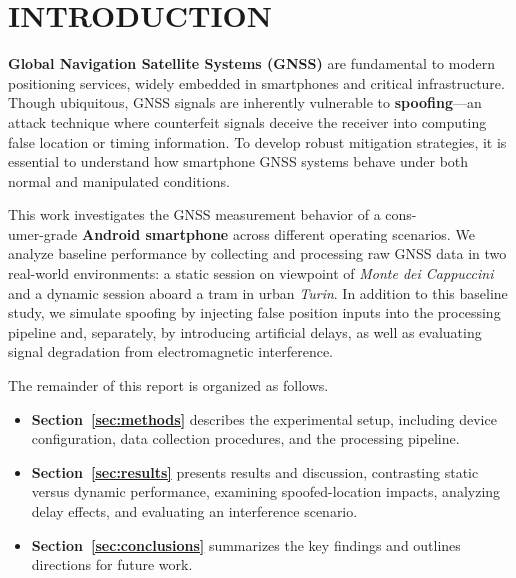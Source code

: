 
\section{INTRODUCTION} \label{sec:introduction}

    \textbf{Global Navigation Satellite Systems (GNSS)} are fundamental to modern positioning services, widely embedded in smartphones and critical infrastructure. 
    Though ubiquitous, GNSS signals are inherently vulnerable to \textbf{spoofing}—an attack technique where counterfeit signals deceive the receiver into computing false location or timing information. 
    To develop robust mitigation strategies, it is essential to understand how smartphone GNSS systems behave under both normal and manipulated conditions.

    \noindent This work investigates the GNSS measurement behavior of a cons-\\umer-grade \textbf{Android smartphone} across different operating scenarios. 
    We analyze baseline performance by collecting and processing raw GNSS data in two real-world environments: a static session on viewpoint of \textit{Monte dei Cappuccini} and a dynamic session aboard a tram in urban \textit{Turin}. 
    In addition to this baseline study, we simulate spoofing by injecting false position inputs into the processing pipeline and, separately, by introducing artificial delays, as well as evaluating signal degradation from electromagnetic interference.

    \noindent The remainder of this report is organized as follows.
    
    \begin{itemize}
        \item \textbf{Section~\ref{sec:methods}} describes the experimental setup, including device configuration, data collection procedures, and the processing pipeline.
        \item \textbf{Section~\ref{sec:results}} presents results and discussion, contrasting static versus dynamic performance, examining spoofed-location impacts, analyzing delay effects, and evaluating an interference scenario.
        \item \textbf{Section~\ref{sec:conclusions}} summarizes the key findings and outlines directions for future work.
    \end{itemize}
